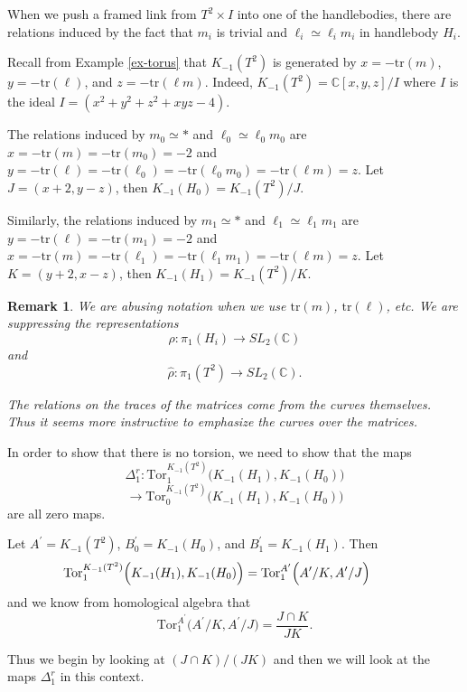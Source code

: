 \documentclass{slides}
\newcommand{\tr}{\mathrm{tr}}
\newcommand{\bbc}{\mathbb{C}}
\newcommand{\slc}{SL_2(\mathbb{C})}
\newtheorem{remark}{Remark}
\begin{document}
\begin{slide}
When we push a framed link from $T^2 \times I$ into
one of the handlebodies, there are relations induced by the fact that
$m_i$ is trivial and $\ell_i \simeq \ell_i m_i$ in handlebody $H_i$.

Recall from Example \ref{ex-torus} that $K_{-1}(T^2)$ is
generated by $x = -\tr(m)$, $y = -\tr(\ell)$, and $z = -\tr(\ell m)$.
Indeed,
$K_{-1}(T^2) = \bbc[x,y,z] / I$ where $I$ is the ideal
$I = (x^2+y^2+z^2+xyz-4)$.

The relations induced by $m_0 \simeq *$ and $\ell_0 \simeq \ell_0 m_0$
are $x = -\tr(m) = -\tr(m_0) = -2$ and
$y = -\tr(\ell) = -\tr(\ell_0) = -\tr(\ell_0 m_0) = -\tr(\ell m) = z.$
Let $J = (x+2, y-z)$, then $K_{-1}(H_0) = K_{-1}(T^2) / J$.

Similarly, the relations induced by $m_1 \simeq *$ and
$\ell_1 \simeq \ell_1 m_1$ are $y = -\tr(\ell) = -\tr(m_1) = -2$ and
$x = -\tr(m) = -\tr(\ell_1) = -\tr(\ell_1 m_1) = -\tr(\ell m) = z.$
Let $K = (y+2, x-z)$, then $K_{-1}(H_1) = K_{-1}(T^2) / K$.
\end{slide}

\begin{slide}
\begin{remark}
We are abusing
notation when we use $\tr(m)$, $\tr(\ell)$, etc.  We are suppressing
the representations $$\rho : \pi_1(H_i) \to \slc$$ and
$$\hat{\rho} : \pi_1(T^2) \to \slc.$$

The relations on the traces of the
matrices come from the curves themselves.  Thus it seems more instructive
to emphasize the curves over the matrices.
\end{remark}
\end{slide}

\begin{slide}
In order to show that there is no torsion, we need to
show that the maps
\[\Delta^r_1 :
\mathrm{Tor}^{K_{-1}(T^2)}_1 \Big( K_{-1}(H_1), K_{-1}(H_0) \Big)\]
\[
\to
\mathrm{Tor}^{K_{-1}(T^2)}_0 \Big( K_{-1}(H_1), K_{-1}(H_0) \Big)\]
are all zero maps.

Let $A^{\prime} = K_{-1}(T^2)$, $B^{\prime}_0 = K_{-1}(H_0)$, and
$B^{\prime}_1 = K_{-1}(H_1)$.  Then
\[\hspace{-1cm} \mathrm{Tor}^{K_{-1}(T^2)}_1 \Big( K_{-1}(H_1), K_{-1}(H_0) \Big) =
\mathrm{Tor}_1^{A^{\prime}} \Big( A^{\prime} / K, A^{\prime} / J \Big) \]
and we know from
homological algebra that
\[
\mathrm{Tor}_1^{A^{\prime}} \Big( A^{\prime} / K, A^{\prime} / J \Big)
= \frac{J \cap K}{JK}.
\]

Thus we begin by looking at $(J \cap K)/(JK)$ and then we will look at the
maps $\Delta^r_1$ in this context.
\end{slide}
\end{document}
